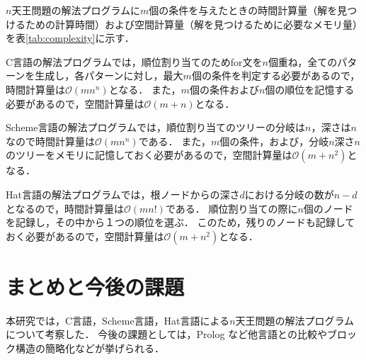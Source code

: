 \documentclass[10pt,a4j,twocolumn,oneside]{jsarticle}
\begin{document}
$n$天王問題の解法プログラムに$m$個の条件を与えたときの時間計算量（解を見つけるための計算時間）および空間計算量（解を見つけるために必要なメモリ量）を表\ref{tab:complexity}に示す．

C言語の解法プログラムでは，順位割り当てのためfor文を$n$個重ね，全てのパターンを生成し，各パターンに対し，最大$m$個の条件を判定する必要があるので，時間計算量は$\mathcal O(mn^n)$となる．
また，$m$個の条件および$n$個の順位を記憶する必要があるので，空間計算量は$\mathcal O(m+n)$となる．

Scheme言語の解法プログラムでは，順位割り当てのツリーの分岐は$n$，深さは$n$なので時間計算量は$\mathcal O (mn^n)$である．
また，$m$個の条件，および，分岐$n$深さ$n$のツリーをメモリに記憶しておく必要があるので，空間計算量は$\mathcal O(m+n^2)$となる．

Hat言語の解法プログラムでは，根ノードからの深さ$d$における分岐の数が$n-d$となるので，時間計算量は$\mathcal O (mn!)$である．
順位割り当ての際に$n$個のノードを記録し，その中から１つの順位を選ぶ．
このため，残りのノードも記録しておく必要があるので，空間計算量は$\mathcal O (m+n^2)$となる．

\section{まとめと今後の課題}

本研究では，C言語，Scheme言語，Hat言語による$n$天王問題の解法プログラムについて考察した．
今後の課題としては，Prolog など他言語との比較やブロック構造の簡略化などが挙げられる．

% 
% 

% 
% 
\small

\end{document}
